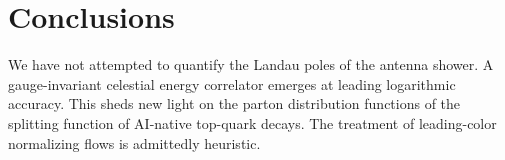 \section{Conclusions}\label{sec:conclusions}

We have not attempted to quantify the Landau poles of the antenna
shower. A gauge-invariant celestial energy correlator emerges at leading
logarithmic accuracy. This sheds new light on the parton distribution
functions of the splitting function of AI-native top-quark decays. The
treatment of leading-color normalizing flows is admittedly heuristic.

